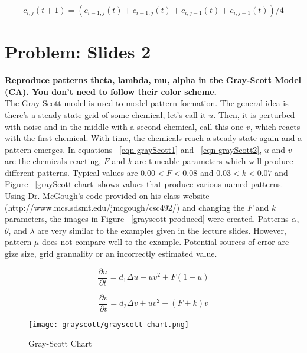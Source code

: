 \begin{equation}
c_{i,j}(t+1) = ( c_{i-1,j}(t) + c_{i+1,j}(t) + c_{i,j-1}(t) + c_{i,j+1}(t)) / 4
\end{equation} \label{heatDiscrete}

\section{Problem: Slides 2}
\textbf{ Reproduce patterns theta, lambda, mu, alpha in the Gray-Scott Model (CA). You don't need to follow their color scheme. } \\
\newline
The Gray-Scott model is used to model pattern formation. The general idea is there's a steady-state grid of some chemical, let's call it $u$. Then, it is perturbed with noise and in the middle with a second chemical, call this one $v$, which reacts with the first chemical. With time, the chemicals reach a steady-state again and a pattern emerges. In equations ~\ref{eqn-grayScott1} and ~\ref{eqn-grayScott2}, $u$ and $v$ are the chemicals reacting, $F$ and $k$ are tuneable parameters which will produce different patterns. Typical values are $ 0.00 < F < 0.08 $ and $ 0.03 < k < 0.07 $ and Figure ~\ref{grayScott-chart} shows values that produce various named patterns.\\

  Using Dr. McGough's code provided on his class website (http://www.mcs.sdsmt.edu/jmcgough/csc492/) and changing the $F$ and $k$ parameters, the images in Figure ~\ref{grayscott-produced} were created. Patterns $\alpha$, $\theta$, and  $\lambda$ are very similar to the examples given in the lecture slides. However, pattern $\mu$ does not compare well to the example. Potential sources of error are gize size, grid granuality or an incorrectly estimated value.

\begin{equation}
\frac{ \partial u}{ \partial t } = d_1  \Delta u - uv^2 + F(1-u)
\end{equation} \label{eqn-grayScott1}

\begin{equation}
\frac{ \partial v}{ \partial t } = d_2 \Delta v + uv^2 - (F+k)v
\end{equation} \label{eqn-grayScott2}

\begin{figure}[tbh]
\begin{center}
\texttt{[image: grayscott/grayscott-chart.png]}
\caption{ Gray-Scott Chart }
\end{center}
\end{figure}\label{grayScott-chart}

